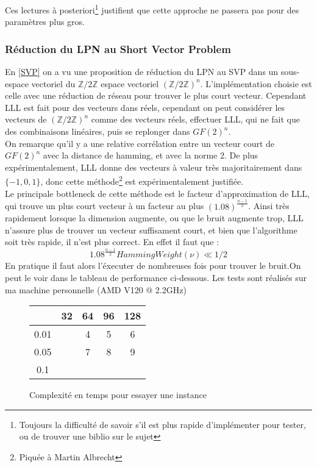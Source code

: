 \documentclass{article}		%
\theoremstyle{definition}
\theoremstyle{plain}
\begin{document}
Ces lectures à posteriori\footnote{Toujours la difficulté de savoir s'il
est plus rapide d'implémenter pour tester, ou de trouver une biblio sur
le sujet} justifient que cette approche ne passera pas pour
des paramètres plus gros. 

\subsubsection{Réduction du LPN au Short Vector Problem}\label{Impsvp}
En \ref{SVP} on a vu une proposition de réduction du LPN au SVP dans un
sous-espace vectoriel du $\mathbb{Z}/2\mathbb{Z}$ espace vectoriel
$(\mathbb{Z}/2\mathbb{Z})^n$. L'implémentation choisie est celle avec une
réduction de réseau pour trouver le plus court vecteur. Cependant LLL
est fait pour des vecteurs dans réels, cependant on peut considérer les
vecteurs de $(\mathbb{Z}/2\mathbb{Z})^n$ comme des vecteurs réels,
effectuer LLL, qui ne fait que des combinaisons linéaires, puis se
replonger dans $GF(2)^n$.
\\ 
On remarque qu'il y a une relative corrélation entre un vecteur court de
$GF(2)^n$ avec la distance de hamming, et avec la norme 2. De plus
expérimentalement, LLL donne des vecteurs à valeur très majoritairement
dans $\{-1,0,1\}$, donc cette méthode\footnote{Piquée à Martin Albrecht}
est expérimentalement justifiée.
\\
Le principale bottleneck de cette méthode est le facteur d'approximation
de LLL, qui trouve un plus court vecteur à un facteur au plus 
$(1.08)^{\frac {n-1} {2}}$. Ainsi très rapidement lorsque la
dimension augmente, ou que le bruit augmente trop, LLL n'assure plus
de trouver
un vecteur suffisament court, et bien que l'algorithme soit
très rapide, il n'est plus correct.
En effet il faut que : $$1.08^{\frac {n-1} {2}}HammingWeight(\nu)\ll1/2
$$ 
 En pratique il faut alors l'éxecuter
de nombreuses fois pour trouver le bruit.On 
peut le voir dans le tableau de performance ci-dessous. Les tests sont
réalisés sur ma machine personnelle (AMD V120 @ 2.2GHz)
\\
\begin{figure}
\caption{Complexité en temps pour essayer une instance}
\begin{center}
\begin{tabular}{|c |c | c | c | c | }
\hline
   & 32 & 64 & 96 & 128 \\
\hline
 0.01  & &4 & 5 & 6 \\
\hline
  0.05 & &7 & 8 & 9 \\
\hline
 0.1& & & &\\
 \hline
 \end{tabular}
\end{center}
\end{figure}
\end{document}
